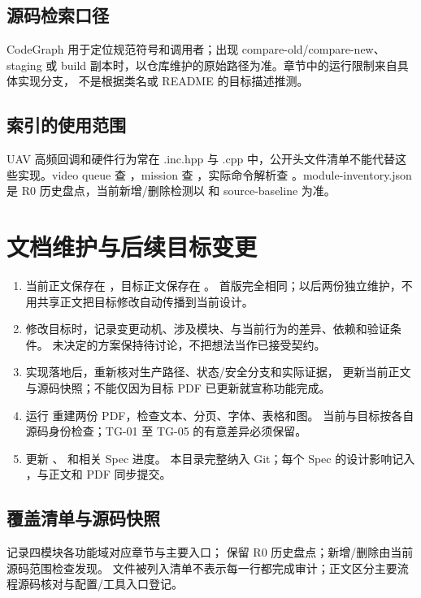 \subsection{源码检索口径}
CodeGraph 用于定位规范符号和调用者；出现 compare-old/compare-new、staging 或 build
副本时，以仓库维护的原始路径为准。章节中的运行限制来自具体实现分支，
不是根据类名或 README 的目标描述推测。


\subsection{索引的使用范围}
UAV 高频回调和硬件行为常在 .inc.hpp 与 .cpp 中，公开头文件清单不能代替这些实现。video queue 查 ，mission 查 ，实际命令解析查 。module-inventory.json 是 R0 历史盘点，当前新增/删除检测以  和 source-baseline 为准。

\newpage

\section{文档维护与后续目标变更}
\begin{enumerate}
\item 当前正文保存在 ，目标正文保存在 。
首版完全相同；以后两份独立维护，不用共享正文把目标修改自动传播到当前设计。
\item 修改目标时，记录变更动机、涉及模块、与当前行为的差异、依赖和验证条件。
未决定的方案保持待讨论，不把想法当作已接受契约。
\item 实现落地后，重新核对生产路径、状态/安全分支和实际证据，
更新当前正文与源码快照；不能仅因为目标 PDF 已更新就宣称功能完成。
\item 运行  重建两份 PDF，检查文本、分页、字体、表格和图。
当前与目标按各自源码身份检查；TG-01 至 TG-05 的有意差异必须保留。
\item 更新 、 和相关 Spec 进度。
本目录完整纳入 Git；每个 Spec 的设计影响记入 ，与正文和 PDF 同步提交。
\end{enumerate}

\subsection{覆盖清单与源码快照}
 记录四模块各功能域对应章节与主要入口；
 保留 R0 历史盘点；新增/删除由当前源码范围检查发现。
文件被列入清单不表示每一行都完成审计；正文区分主要流程源码核对与配置/工具入口登记。

